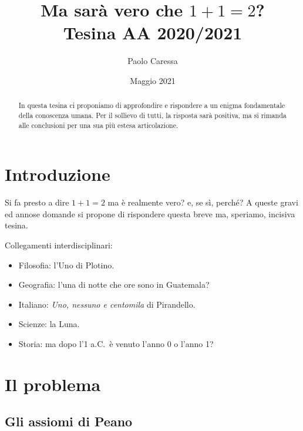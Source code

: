 \documentclass[a4paper,14pt]{report}
\title{Ma sarà vero che $1+1=2$?\\[3em]
\small Tesina AA 2020/2021}
\author{Paolo Caressa}
\date{Maggio 2021}
\begin{document}
\maketitle

\begin{abstract}
In questa tesina ci proponiamo di approfondire e rispondere a un enigma fondamentale della conoscenza umana. Per il sollievo di tutti, la risposta sarà positiva, ma si rimanda alle conclusioni per una sua più estesa articolazione.
\end{abstract}

\tableofcontents

\pagestyle{headings}

\chapter*{Introduzione}

Si fa presto a dire $1+1=2$ ma è realmente vero? e, se sì, perché? A queste gravi ed annose domande si propone di rispondere questa breve ma, speriamo, incisiva tesina.

Collegamenti interdisciplinari:
\begin{itemize}
    \item Filosofia: l'Uno di Plotino.
    \item Geografia: l'una di notte che ore sono in Guatemala?
    \item Italiano: {\em Uno, nessuno e centomila} di Pirandello.
    \item Scienze: la Luna.
    \item Storia: ma dopo l'1 a.C.\ è venuto l'anno 0 o l'anno 1?
\end{itemize}

\chapter{Il problema}

\section{Gli assiomi di Peano}
\end{document}
